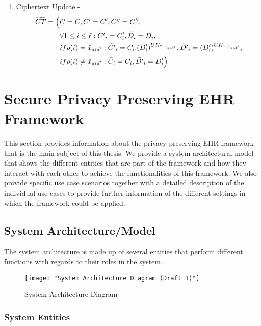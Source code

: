 \begin{enumerate}
\begin{enumerate}
		\item Ciphertext Update - 
		\begin{align*}
		\widetilde{CT} = \Bigl(&\tilde{C} = C, \tilde{C'} = C', \tilde{C''} = C'',\\
		&\forall 1 \leq i \leq \ell: \tilde{C'}_{i} = C'_{i}, \tilde{D}_{i} = D_{i},\\
		&if \rho(i) = \tilde{x}_{aid'} : \tilde{C'}_{i} = C_{i} . (D'_{i})^{UK_{2,\tilde{x}_{aid'}}}, \tilde{D'}_{i} = (D'_{i})^{UK_{1,\tilde{x}_{aid'}}},\\
		&if \rho(i) \neq \tilde{x}_{aid'} : \tilde{C}_{i} = C_{i}, \tilde{D'}_{i} = D'_{i}\Bigl)
		\end{align*}
	\end{enumerate}
	
\end{enumerate}


\section{Secure Privacy Preserving EHR Framework}

This section provides information about the privacy preserving EHR framework that is the main subject of this thesis. We provide a system architectural model that shows the different entities that are part of the framework and how they interact with each other to achieve the functionalities of this framework. We also provide specific use case scenarios together with a detailed description of the individual use cases to provide further information of the different settings in which the framework could be applied.

\subsection{System Architecture/Model}

The system architecture is made up of several entities that perform different functions with regards to their roles in the system.

\begin{figure}[]
	\centering
	\texttt{[image: "System Architecture Diagram (Draft 1)"]}
	\caption{System Architecture Diagram}
	\label{fig:sysarch}
\end{figure}

\subsubsection{System Entities}

